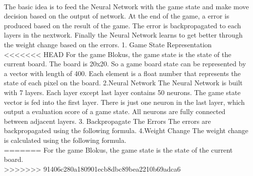 \documentclass{report}
\begin{document}
	\\
	The basic idea is to feed the Neural Network with the game state and make move decision based on the output of network. At the end of the game, a error is produced based on the result of the 
	game. The error is backpropagated to each layers in the nextwork. Finally the Neural Network learns to get better through the weight change based on the errors.
	1. Game State Representation
<<<<<<< HEAD
	For the game Blokus, the game state is the state of the current board. The board is 20x20. So a game board state can be represented by a vector with length of 400. Each element is a float number that
	represents the state of each pixel on the board. 
	2.Neural Network
	The Neural Network is built with 7 layers. Each layer except last layer contains 50 neurons. The game state vector is fed into the first layer. There is just one neuron in the last layer,
	 which output a evaluation score of a game state. All neurons are fully connected between adjacent layers. 
	3. Backpropagate The Errors
	The errors are backpropagated using the following formula.
	4.Weight Change
	The weight change is calculated using the following formula.
	\blindtext\\
=======
	For the game Blokus, the game state is the state of the current board.\\
>>>>>>> 91406c280a180901ecb8dbc89bea2210b69adca6
	
\end{document}
